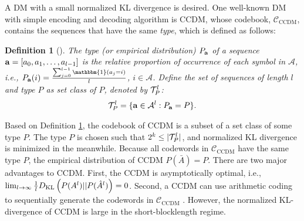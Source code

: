 \documentclass [PhD] {uclathes}
\newtheorem{definition}{Definition}
\begin{document}
A DM with a small normalized KL divergence is desired.
One well-known DM with simple encoding and decoding algorithm is CCDM, whose codebook, $\mathcal{C}_{\text{CCDM}}$, contains the sequences that have the same \textit{type}, which is defined as follows\cite[Chapter~11]{thomas2006elements}: 

\begin{definition}[]\label{def: types}
    The type  (or empirical distribution) ${P}_{\mathbf{a}}$ of a sequence $\mathbf{a}=[ a_0,a_1,\ldots,a_{l-1}]$ is the relative proportion of occurrence of each symbol in $\mathcal{A}$, i.e., ${P}_{\dmou}(i)=\frac{\sum_{j=0}^{\length-1} \mathbbm{1}(a_j=i)}{\length}$, $i\in\mathcal{A}$. Define the set of sequences of length $l$ and type $P$ as set class of $P$, denoted by   $\mathcal{T}_{P}^{l}$:
    \begin{align}
        \mathcal{T}_{P}^{l}=\{\mathbf{a}\in\mathcal{A}^l: P_{\mathbf{a}}=P\}.
    \end{align}
\end{definition}

Based on Definition \ref{def: types}, the codebook of CCDM is a subset of a set class of some type $P$. The type $P$ is chosen such that $2^{k}\leq |\mathcal{T}_{P}^{l}|$, and normalized KL divergence  is minimized in the meanwhile. Because all codewords in $\mathcal{C}_{\mathrm{CCDM}}$ have the same type $P$, the empirical distribution of CCDM $P(\bar{A})=P.$  There are two major advantages to CCDM. First, the CCDM is asymptotically optimal, i.e.,  $\lim_{l\rightarrow\infty}\frac{1}{l}D_{\mathrm{KL}}\left(P(A^l)||P(\hat{A}^l)\right)=0$.  Second, a CCDM can use arithmetic coding to sequentially generate the  codewords in $\mathcal{C}_{\mathrm{CCDM}}$ \cite{CCDM_schulte}. However, the normalized KL-divergence of CCDM is large in the short-blocklength regime\cite{CCDM_schulte}.
\end{document}

